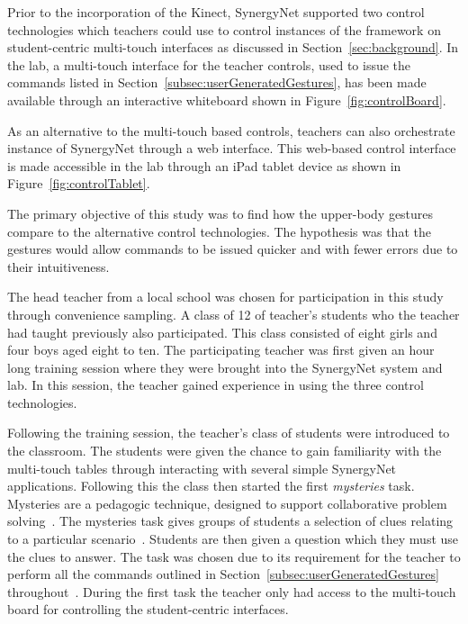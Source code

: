 \documentclass[link]{IWCOMP}
\begin{document}
Prior to the incorporation of the Kinect, SynergyNet supported two control technologies which teachers could use to control instances of the framework on student-centric multi-touch interfaces as discussed in Section~\ref{sec:background}.
In the lab, a multi-touch interface for the teacher controls, used to issue the commands listed in Section~\ref{subsec:userGeneratedGestures}, has been made available through an interactive whiteboard shown in Figure~\ref{fig:controlBoard}.

As an alternative to the multi-touch based controls, teachers can also orchestrate instance of SynergyNet through a web interface.
This web-based control interface is made accessible in the lab through an iPad tablet device as shown in Figure~\ref{fig:controlTablet}.

The primary objective of this study was to find how the upper-body gestures compare to the alternative control technologies.
The hypothesis was that the gestures would allow commands to be issued quicker and with fewer errors due to their intuitiveness.

The head teacher from a local school was chosen for participation in this study through convenience sampling.
A class of 12 of teacher's students who the teacher had taught previously also participated.
This class consisted of eight girls and four boys aged eight to ten.
The participating teacher was first given an hour long training session where they were brought into the SynergyNet system and lab.  
In this session, the teacher gained experience in using the three control technologies.

Following the training session, the teacher's class of students were introduced to the classroom.
The students were given the chance to gain familiarity with the multi-touch tables through interacting with several simple SynergyNet applications.
Following this the class then started the first \textit{mysteries} task.
Mysteries are a pedagogic technique, designed to support collaborative problem solving~\cite{Leat2002}.
The mysteries task gives groups of students a selection of clues relating to a particular scenario~\cite{Higgins2011b}.
Students are then given a question which they must use the clues to answer.
The task was chosen due to its requirement for the teacher to perform all the commands outlined in Section~\ref{subsec:userGeneratedGestures} throughout~\cite{Mercier2012}.
During the first task the teacher only had access to the multi-touch board for controlling the student-centric interfaces.
\end{document}
